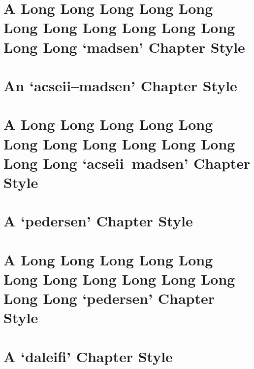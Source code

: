 \documentclass[10pt,a4paper,extrafontsizes,oldfontcommands,oneside]{memoir}
\begin{document}


\chapter{A Long Long Long Long Long Long Long Long Long Long Long Long Long `madsen' Chapter Style} %
\label{chap:a_long_madsen_chapter_style}


\chapter{An `acseii--madsen' Chapter Style} %
\label{chap:a_acseii_chapter_style}


\chapter{A Long Long Long Long Long Long Long Long Long Long Long Long Long `acseii--madsen' Chapter Style} %
\label{chap:a_long_acseii_chapter_style}


\chapter{A `pedersen' Chapter Style} %
\label{chap:a_pedersen_chapter_style}



\chapter{A Long Long Long Long Long Long Long Long Long Long Long Long Long `pedersen' Chapter Style} %
\label{chap:a_long_pedersen_chapter_style}



\chapter{A `daleifi' Chapter Style} %
\label{chap:a_daleifi_chapter_style}

\end{document}

